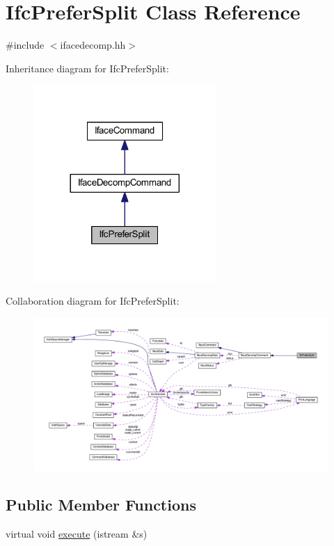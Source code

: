 \hypertarget{class_ifc_prefer_split}{}\section{Ifc\+Prefer\+Split Class Reference}
\label{class_ifc_prefer_split}


{\ttfamily \#include $<$ifacedecomp.\+hh$>$}



Inheritance diagram for Ifc\+Prefer\+Split\+:
\nopagebreak
\begin{figure}[H]
\begin{center}
\leavevmode
\includegraphics[width=197pt]{class_ifc_prefer_split__inherit__graph}
\end{center}
\end{figure}


Collaboration diagram for Ifc\+Prefer\+Split\+:
\nopagebreak
\begin{figure}[H]
\begin{center}
\leavevmode
\includegraphics[width=350pt]{class_ifc_prefer_split__coll__graph}
\end{center}
\end{figure}
\subsection*{Public Member Functions}
\begin{DoxyCompactItemize}
\item 
virtual void \mbox{\hyperlink{class_ifc_prefer_split_aaf3f2d962ed56ee7e784b8b88ca073d9}{execute}} (istream \&s)
\end{DoxyCompactItemize}
